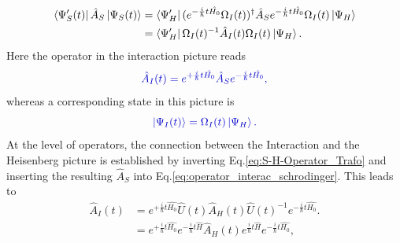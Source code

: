 \documentclass[12pt, titlepage]{article}
\begin{document}
\begin{subequations}
\textcolor[RGB]{0,0,0}{
\begin{align}\label{eq:matrix_ele_for_interaction}
	\bra{\Psi_{S}^{\prime}(t)}
	\hat{A}_{S}
	\ket{\Psi_{S}(t)}
  		&= 	\bra{\Psi_{H}^{\prime}}
			(e^{-\frac{i}{\hbar}t \hat{H_{0}}}	
			\Omega_{I} (t))^{\dagger}
			\hat{A}_{S}
			e^{-\frac{i}{\hbar}t \hat{H_{0}}}
			\Omega_{I} (t)
			\ket{\Psi_{H}}
  		\\
  		&= \bra{\Psi^{\prime}_{H}}
  			\Omega_{I}(t)^{-1}
			\hat{A}_{I}(t)
			\Omega_{I} (t)
			\ket{\Psi_{H}}
			.
\end{align}
}
\end{subequations}
Here the operator in the interaction picture reads
\begin{equation}\label{eq:operator_interac_schrodinger}
\textcolor[RGB]{0,0,204}{
	\hat{A}_{I}(t)
	=
	e^{+\frac{i}{\hbar}t \hat{H_{0}}}
	\hat{A}_{S}
	e^{-\frac{i}{\hbar}t \hat{H_{0}}}	
,
}
\end{equation}
whereas a corresponding state in this picture is
\begin{equation}\label{eq:state_interac_schrodinger}
\textcolor[RGB]{0,0,204}{
	\ket{\Psi_{I}(t)}
	=\Omega_{I} (t)
			\ket{\Psi_{H}}
		.
}
\end{equation}
At the level of operators, the connection between the Interaction and the Heisenberg picture is established by inverting Eq.\enskip\eqref{eq:S-H-Operator_Trafo} and inserting the resulting $ 	\hat{A}_{S}
 $ into Eq.\enskip\eqref{eq:operator_interac_schrodinger}. This leads to
\begin{subequations}
\begin{align}
	\hat{A}_{I}(t)
	&=
	e^{+\frac{i}{\hbar}t \hat{H_{0}}}
	\hat{U}(t)	
	\hat{A}_{H}(t)
	\hat{U}(t)^{-1}	
	e^{-\frac{i}{\hbar}t \hat{H_{0}}}	.
	\\
	&=
	e^{+\frac{i}{\hbar}t \hat{H_{0}}}
	e^{-\frac{i}{\hbar}t\hat{H}}
	\hat{A}_{H}(t)
	e^{\frac{i}{\hbar}t\hat{H}}	
	e^{-\frac{i}{\hbar}t \hat{H_{0}}}	
	,
\end{align}
\end{subequations}
\end{document}
